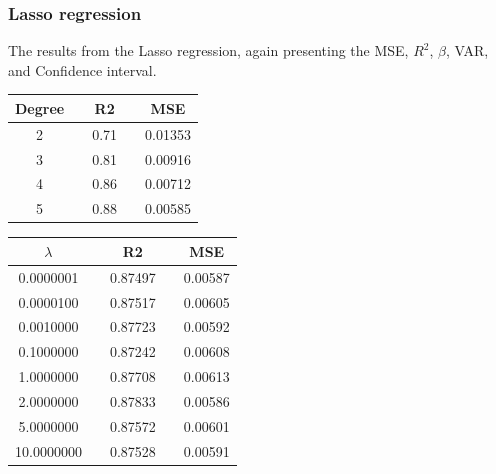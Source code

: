 

\subsubsection{Lasso regression}
The results from the Lasso regression, again presenting the MSE, $R^2$, $\beta$, VAR, and Confidence interval.


 \begin{center}
 \label{tab:Lasso_Degree_R2_MSE}
 \begin{tabularx}{\textwidth}{c X c X c  }
     \hline
     \hline
         Degree && R2 && MSE \\
         \hline
2      && 0.71 && 0.01353 \\ 
3      && 0.81 && 0.00916 \\ 
4      && 0.86 && 0.00712 \\ 
5      && 0.88 && 0.00585 \\ \hline
 \end{tabularx}
 \end{center}
 
 
 \begin{center}
 \label{tab:Degree_R2_MSE}
 \begin{tabularx}{\textwidth}{c X c X c  }
     \hline
     \hline
$\lambda$    &&R2     &&MSE     \\
         \hline
0.0000001 &&0.87497&&0.00587 \\
0.0000100 &&0.87517&&0.00605 \\
0.0010000 &&0.87723&&0.00592 \\
0.1000000 &&0.87242&&0.00608 \\
1.0000000 &&0.87708&&0.00613 \\
2.0000000 &&0.87833&&0.00586 \\
5.0000000 &&0.87572&&0.00601 \\
10.0000000 && 0.87528&&0.00591
 \end{tabularx}
 \end{center}
 
